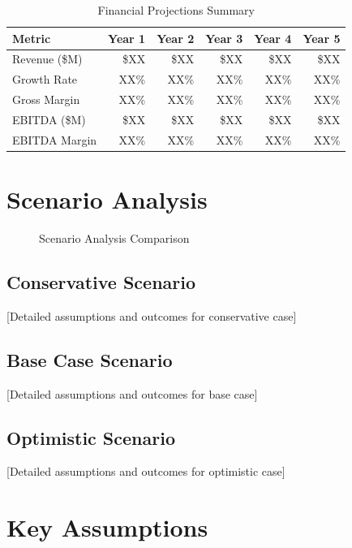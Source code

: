 \documentclass[11pt,letterpaper]{report}
\begin{document}
\begin{table}[htbp]
\centering
\caption{Financial Projections Summary}
\begin{tabular}{@{}lrrrrr@{}}
\toprule
\textbf{Metric} & \textbf{Year 1} & \textbf{Year 2} & \textbf{Year 3} & \textbf{Year 4} & \textbf{Year 5} \\
\midrule
Revenue (\$M) & \$XX & \$XX & \$XX & \$XX & \$XX \\
\rowcolor{tablealt} Growth Rate & XX\% & XX\% & XX\% & XX\% & XX\% \\
Gross Margin & XX\% & XX\% & XX\% & XX\% & XX\% \\
\rowcolor{tablealt} EBITDA (\$M) & \$XX & \$XX & \$XX & \$XX & \$XX \\
EBITDA Margin & XX\% & XX\% & XX\% & XX\% & XX\% \\
\bottomrule
\end{tabular}
\label{tab:financials}
\end{table}

\section{Scenario Analysis}


\begin{figure}[htbp]
\centering
\caption{Scenario Analysis Comparison}
\label{fig:scenarios}
\end{figure}

\subsection{Conservative Scenario}
[Detailed assumptions and outcomes for conservative case]

\subsection{Base Case Scenario}
[Detailed assumptions and outcomes for base case]

\subsection{Optimistic Scenario}
[Detailed assumptions and outcomes for optimistic case]

\section{Key Assumptions}
\end{document}
